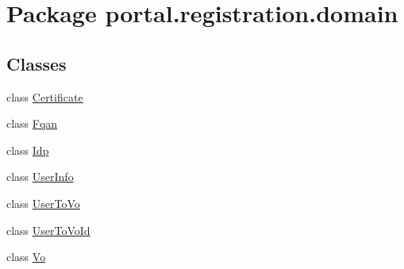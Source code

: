 \hypertarget{namespaceportal_1_1registration_1_1domain}{
\section{Package portal.registration.domain}
\label{namespaceportal_1_1registration_1_1domain}
}
\subsection*{Classes}
\begin{DoxyCompactItemize}
\item 
class \hyperlink{classportal_1_1registration_1_1domain_1_1Certificate}{Certificate}
\item 
class \hyperlink{classportal_1_1registration_1_1domain_1_1Fqan}{Fqan}
\item 
class \hyperlink{classportal_1_1registration_1_1domain_1_1Idp}{Idp}
\item 
class \hyperlink{classportal_1_1registration_1_1domain_1_1UserInfo}{UserInfo}
\item 
class \hyperlink{classportal_1_1registration_1_1domain_1_1UserToVo}{UserToVo}
\item 
class \hyperlink{classportal_1_1registration_1_1domain_1_1UserToVoId}{UserToVoId}
\item 
class \hyperlink{classportal_1_1registration_1_1domain_1_1Vo}{Vo}
\end{DoxyCompactItemize}
